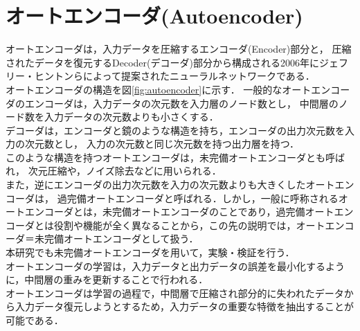 \section{オートエンコーダ(Autoencoder)}
オートエンコーダは，入力データを圧縮するエンコーダ(Encoder)部分と，
圧縮されたデータを復元するDecoder(デコーダ)部分から構成される2006年にジェフリー・ヒントンらによって提案された\cite{autoencoder}ニューラルネットワークである．\cite{unsupervised} \\
オートエンコーダの構造を図\ref{fig:autoencoder}に示す．
一般的なオートエンコーダのエンコーダは，入力データの次元数を入力層のノード数とし，
中間層のノード数を入力データの次元数よりも小さくする．\\
デコーダは，エンコーダと鏡のような構造を持ち，エンコーダの出力次元数を入力の次元数とし，
入力の次元数と同じ次元数を持つ出力層を持つ．\\
このような構造を持つオートエンコーダは，未完備オートエンコーダとも呼ばれ，
次元圧縮や，ノイズ除去などに用いられる．\\
また，逆にエンコーダの出力次元数を入力の次元数よりも大きくしたオートエンコーダは，
過完備オートエンコーダと呼ばれる．しかし，一般に呼称されるオートエンコーダとは，未完備オートエンコーダのことであり，過完備オートエンコーダとは役割や機能が全く異なることから，この先の説明では，オートエンコーダ＝未完備オートエンコーダとして扱う．\\
本研究でも未完備オートエンコーダを用いて，実験・検証を行う．\\

オートエンコーダの学習は，入力データと出力データの誤差を最小化するように，中間層の重みを更新することで行われる．\\

オートエンコーダは学習の過程で，中間層で圧縮され部分的に失われたデータから入力データ復元しようとするため，入力データの重要な特徴を抽出することが可能である．\\



\newpage